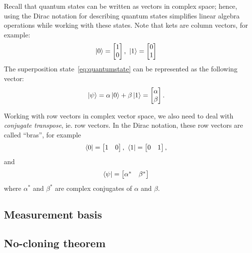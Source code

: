 \documentclass[cryptography,review,submit,pdftex,moreauthors,amsmath,amssymb,aps,strict]{Definitions/mdpi}
\begin{document}
\noindent Recall that quantum states can be written as vectors in complex space; hence, using the Dirac notation for describing quantum states simplifies linear algebra operations while working with these states. Note that kets are column vectors, for example:
\begin{align}
    \ket{0}=\begin{bmatrix} 1\\ 0
\end{bmatrix} \text{, }\ket{1}=\begin{bmatrix} 0\\1
\end{bmatrix}
\end{align}
The superposition state~\eqref{eq:quantumstate} can be represented as the following vector:
\begin{align}
    \ket{\psi}=\alpha\ket{0}+\beta\ket{1} = \begin{bmatrix} \alpha\\ \beta
\end{bmatrix}.
\end{align}

Working with row vectors in complex vector space, we also need to deal with \textit{conjugate transpose}, ie. row vectors. In the Dirac notation, these row vectors are called ``bras'', for example
\begin{align}
    \bra{0}= \begin{bmatrix} 1 & 0 \end{bmatrix} \text{, }\bra{1}=\begin{bmatrix} 0 & 1
\end{bmatrix},
\end{align}
and 
\begin{align}
    \bra{\psi}=  \begin{bmatrix} \alpha^* & \beta^*\end{bmatrix}
\end{align}
where $\alpha^*$ and $\beta^*$ are complex conjugates of $\alpha$ and $\beta$.


\subsection{Measurement basis}

\subsection{No-cloning theorem}
\end{document}
